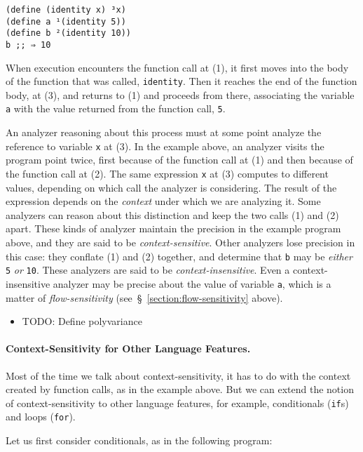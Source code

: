 \documentclass[12pt, oneside]{book}
\begin{document}
\begin{Verbatim}
(define (identity x) ³x)
(define a ¹(identity 5))
(define b ²(identity 10))
b ;; ⇒ 10
\end{Verbatim}

When execution encounters the function call at (1), it first moves into the body of the function that was called, \texttt{identity}. Then it reaches the end of the function body, at (3), and returns to (1) and proceeds from there, associating the variable \texttt{a} with the value returned from the function call, \texttt{5}.

An analyzer reasoning about this process must at some point analyze the reference to variable \texttt{x} at (3). In the example above, an analyzer visits the program point twice, first because of the function call at (1) and then because of the function call at (2). The same expression \texttt{x} at (3) computes to different values, depending on which call the analyzer is considering. The result of the expression depends on the \emph{context} under which we are analyzing it. Some analyzers can reason about this distinction and keep the two calls (1) and (2) apart. These kinds of analyzer maintain the precision in the example program above, and they are said to be \emph{context-sensitive}. Other analyzers lose precision in this case: they conflate (1) and (2) together, and determine that \texttt{b} may be \emph{either} \texttt{5} \emph{or} \texttt{10}. These analyzers are said to be \emph{context-insensitive}. Even a context-insensitive analyzer may be precise about the value of variable \texttt{a}, which is a matter of \emph{flow-sensitivity} (see~§~\ref{section:flow-sensitivity} above).

\begin{itemize}
  \item TODO: Define polyvariance
\end{itemize}

\paragraph{Context-Sensitivity for Other Language Features.}

Most of the time we talk about context-sensitivity, it has to do with the context created by function calls, as in the example above. But we can extend the notion of context-sensitivity to other language features, for example, conditionals (\texttt{if}s) and loops (\texttt{for}).

Let us first consider conditionals, as in the following program:
\end{document}
